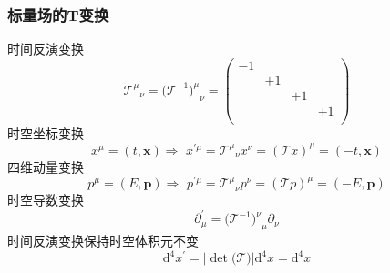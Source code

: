 \subsubsection{标量场的T变换}

时间反演变换
\begin{equation}
    {\mathcal{T} ^{\mu}}_{\nu}=(\mathcal{T} ^{-1}{)^{\mu}}_{\nu}=\left( \begin{matrix}
	-1&		&		&		\\
	&		+1&		&		\\
	&		&		+1&		\\
	&		&		&		+1\\
\end{matrix} \right) 
\end{equation}
时空坐标变换
\begin{equation}
    x^{\mu}=\left( t,\mathbf{x} \right) \Rightarrow \,\,x^{\prime \mu}={\mathcal{T} ^{\mu}}_{\nu}x^{\nu}=(\mathcal{T} x)^{\mu}=\left( -t,\mathbf{x} \right) 
\end{equation}
四维动量变换
\begin{equation}
    p^{\mu}=\left( E,\mathbf{p} \right) \Rightarrow \,\,p^{\prime \mu}={\mathcal{T} ^{\mu}}_{\nu}p^{\nu}=(\mathcal{T} p)^{\mu}=\left( -E,\mathbf{p} \right) 
\end{equation}
时空导数变换
\begin{equation}
    \partial _{\mu}^{\prime}=(\mathcal{T} ^{-1}{)^{\nu}}_{\mu}\partial _{\nu}
\end{equation}
时间反演变换保持时空体积元不变
\begin{equation}
    \mathrm{d}^4x^{\prime}=\left| \det\mathrm{(}\mathcal{T} ) \right|\mathrm{d}^4x=\mathrm{d}^4x
\end{equation}
